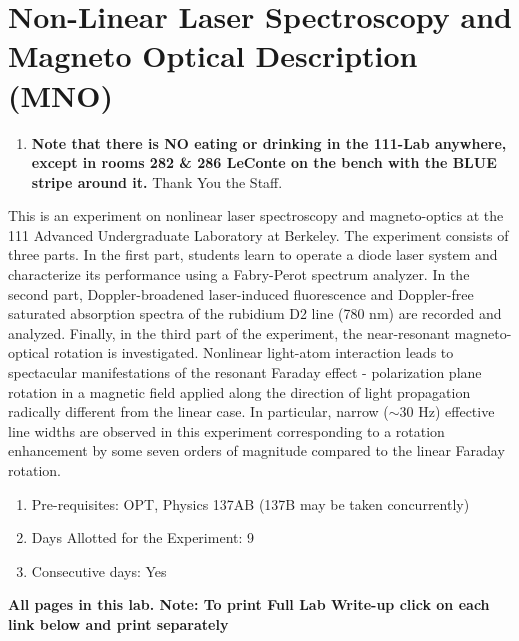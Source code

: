 \documentclass{../lab}
\begin{document}
\maketitle

\tableofcontents

\section{Non-Linear Laser Spectroscopy and Magneto Optical Description (MNO)}

\begin{enumerate}
    \item \textbf{Note that there is NO eating or drinking in the 111-Lab anywhere, except in rooms 282 \& 286 LeConte on the bench with the BLUE stripe around it.} Thank You the Staff.

\end{enumerate}

This is an experiment on nonlinear laser spectroscopy and magneto-optics at the 111 Advanced Undergraduate Laboratory at Berkeley. The experiment consists of three parts. In the first part, students learn to operate a diode laser system and characterize its performance using a Fabry-Perot spectrum analyzer. In the second part, Doppler-broadened laser-induced fluorescence and Doppler-free saturated absorption spectra of the rubidium D2 line (780 nm) are recorded and analyzed. Finally, in the third part of the experiment, the near-resonant magneto-optical rotation is investigated. Nonlinear light-atom interaction leads to spectacular manifestations of the resonant Faraday effect - polarization plane rotation in a magnetic field applied along the direction of light propagation radically different from the linear case. In particular, narrow ($\sim$30 Hz) effective line widths are observed in this experiment corresponding to a rotation enhancement by some seven orders of magnitude compared to the linear Faraday rotation.

\begin{enumerate}
    \item Pre-requisites: OPT, Physics 137AB (137B may be taken concurrently)

    \item Days Allotted for the Experiment: 9

    \item Consecutive days: Yes

\end{enumerate}

\noindent\textbf{All pages in this lab. Note: To print Full Lab Write-up click on each link below and print separately }
\end{document}
